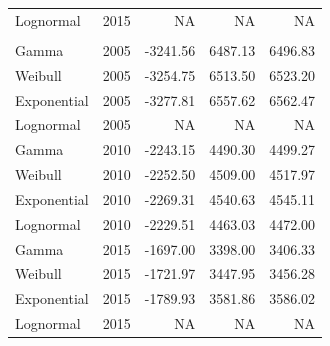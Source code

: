 \documentclass[
11pt, %
oneside, %
english, %
singlespacing, %
]{macthesis} %
\begin{document}
\begin{table}
\begin{tabular}[t]{llrrr}
\hspace{1em}Lognormal & 2015 & NA & NA & \vphantom{1} NA\\
\addlinespace[0.3em]
\multicolumn{5}{l}{\textbf{Destination: Outdoors }}\\
\hspace{1em}Gamma & 2005 & -3241.56 & 6487.13 & 6496.83\\
\hspace{1em}Weibull & 2005 & -3254.75 & 6513.50 & 6523.20\\
\hspace{1em}Exponential & 2005 & -3277.81 & 6557.62 & 6562.47\\
\hspace{1em}Lognormal & 2005 & NA & NA & NA\\
\hspace{1em}Gamma & 2010 & -2243.15 & 4490.30 & 4499.27\\
\hspace{1em}Weibull & 2010 & -2252.50 & 4509.00 & 4517.97\\
\hspace{1em}Exponential & 2010 & -2269.31 & 4540.63 & 4545.11\\
\hspace{1em}Lognormal & 2010 & -2229.51 & 4463.03 & 4472.00\\
\hspace{1em}Gamma & 2015 & -1697.00 & 3398.00 & 3406.33\\
\hspace{1em}Weibull & 2015 & -1721.97 & 3447.95 & 3456.28\\
\hspace{1em}Exponential & 2015 & -1789.93 & 3581.86 & 3586.02\\
\hspace{1em}Lognormal & 2015 & NA & NA & NA\\
\bottomrule
\end{tabular}
\end{table}
\end{document}
